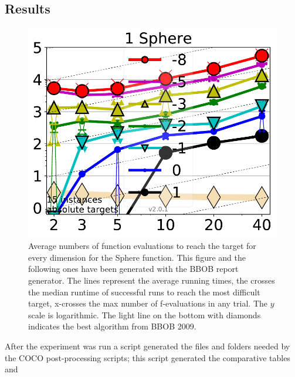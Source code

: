 


\subsection{Results}
\label{sec:results}
\begin{figure}[h!tbp]
    \centering
        \includegraphics[width=5in]{img/Sphere.pdf}
    \caption{Average numbers of function evaluations to reach the target
      for every dimension for the Sphere function. This figure and the
    following ones have been generated with the BBOB report
    generator. The lines represent the average running times, the crosses
    the median runtime of successful runs to reach the most difficult
    target, x-crosses the max number of f-evaluations in any
    trial. The $y$ scale is logarithmic. The light line on the bottom
    with diamonds indicates the best algorithm from BBOB 2009. }
\label{fig:sphere}
\end{figure}
%
After the experiment was run a script generated 
the files and folders needed by the COCO post-processing 
scripts; this script generated the comparative tables and

